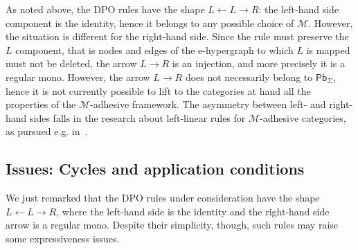 \documentclass[3p]{elsarticle}
\newcommand{\pbc}{\mathsf{Pb}}
\theoremstyle{remark}
\theoremstyle{definition}
\begin{document}
As noted above, the DPO rules have the shape
$L \leftarrow L \rightarrow R$: the left-hand side component is the identity,
hence it belongs to any possible choice of $\mathcal{M}$. 
However, the situation is different for the right-hand side.
Since the rule must preserve the $L$ component, that is nodes and edges of 
the e-hypergraph to which $L$ is mapped must not be deleted, 
the arrow $L \rightarrow R$ is an injection, and more precisely it is 
a regular mono.
%
However, the arrow $L \rightarrow R$ does not necessarily belong to $\pbc_\Sigma$,
hence it is not currently possible to lift to the categories at hand all the properties of the $\mathcal{M}$-adhesive framework.
The asymmetry between left- and right-hand sides falls in the research about left-linear rules for 
$\mathcal{M}$-adhesive categories, as pursued e.g. in~\cite{BaldanC0G24}.

\subsection{Issues: Cycles and application conditions}
We just remarked that the DPO rules under consideration have the shape
$L \leftarrow L \rightarrow R$, where the left-hand side is the identity 
and the right-hand side arrow is  a regular mono.
%
Despite their simplicity, though, such rules may raise some expressiveness issues.
\end{document}
